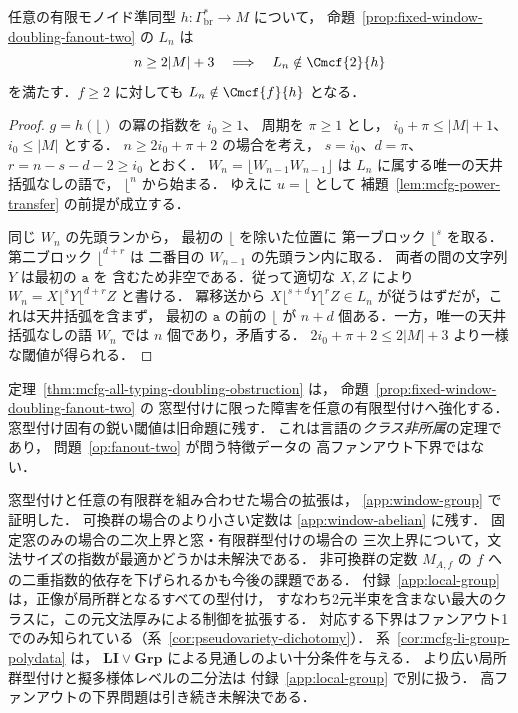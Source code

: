 \begin{theorem}[任意の固定有限型付けは括弧付き倍化族を救済できない]
\label{thm:mcfg-all-typing-doubling-obstruction}
任意の有限モノイド準同型
$h:\Gamma_{\mathrm{br}}^*\to M$ について，
命題~\ref{prop:fixed-window-doubling-fanout-two} の $L_n$ は
\[
 n\ge2|M|+3\quad\Longrightarrow\quad
 L_n\notin\Cmcf{2}{h}
\]
を満たす．$f\ge2$ に対しても
$L_n\notin\Cmcf{f}{h}$ となる．
\end{theorem}
\begin{proof}
$g=h(\lfloor)$ の冪の指数を $i_0\ge1$、
周期を $\pi\ge1$ とし，
$i_0+\pi\le|M|+1$、$i_0\le|M|$ とする．
$n\ge2i_0+\pi+2$ の場合を考え，
$s=i_0$、$d=\pi$、
$r=n-s-d-2\ge i_0$ とおく．
$W_n=\lfloor W_{n-1}W_{n-1}\rfloor$ は
$L_n$ に属する唯一の天井括弧なしの語で，
$\lfloor^n$ から始まる．
ゆえに $u=\lfloor$ として
補題~\ref{lem:mcfg-power-transfer} の前提が成立する．

同じ $W_n$ の先頭ランから，
最初の $\lfloor$ を除いた位置に
第一ブロック $\lfloor^s$ を取る．
第二ブロック $\lfloor^{d+r}$ は
二番目の $W_{n-1}$ の先頭ラン内に取る．
両者の間の文字列 $Y$ は最初の $\mathtt a$ を
含むため非空である．従って適切な $X,Z$ により
$W_n=X\lfloor^sY\lfloor^{d+r}Z$ と書ける．
冪移送から
$X\lfloor^{s+d}Y\lfloor^rZ\in L_n$
が従うはずだが，これは天井括弧を含まず，
最初の $\mathtt a$ の前の $\lfloor$ が
$n+d$ 個ある．一方，唯一の天井括弧なしの語
$W_n$ では $n$ 個であり，矛盾する．
$2i_0+\pi+2\le2|M|+3$ より一様な閾値が得られる．
\end{proof}

\begin{remark}
定理~\ref{thm:mcfg-all-typing-doubling-obstruction} は，
命題~\ref{prop:fixed-window-doubling-fanout-two} の
窓型付けに限った障害を任意の有限型付けへ強化する．
窓型付け固有の鋭い閾値は旧命題に残す．
これは言語の\emph{クラス非所属}の定理であり，
問題~\ref{op:fanout-two} が問う特徴データの
高ファンアウト下界ではない．
\end{remark}

窓型付けと任意の有限群を組み合わせた場合の拡張は，
\ref{app:window-group} で証明した．
可換群の場合のより小さい定数は
\ref{app:window-abelian} に残す．
固定窓のみの場合の二次上界と窓・有限群型付けの場合の
三次上界について，文法サイズの指数が最適かどうかは未解決である．
非可換群の定数 $M_{A,f}$ の $f$ への二重指数的依存を下げられるかも今後の課題である．
付録~\ref{app:local-group} は，正像が局所群となるすべての型付け，
すなわち2元半束を含まない最大のクラスに，この元文法厚みによる制御を拡張する．
対応する下界はファンアウト1でのみ知られている（系~\ref{cor:pseudovariety-dichotomy}）．
系~\ref{cor:mcfg-li-group-polydata} は，
$\mathbf{LI}\vee\mathbf{Grp}$ による見通しのよい十分条件を与える．
より広い局所群型付けと擬多様体レベルの二分法は
付録~\ref{app:local-group} で別に扱う．
高ファンアウトの下界問題は引き続き未解決である．

